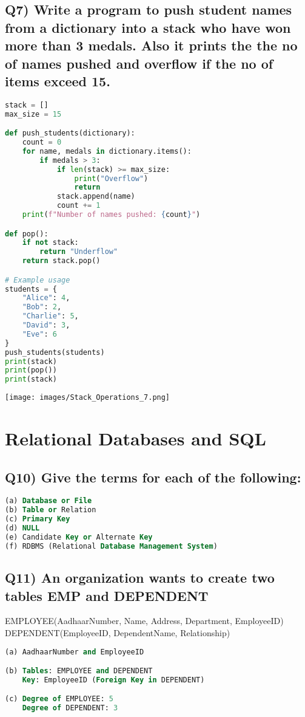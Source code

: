 \documentclass{article}
\begin{document}
\subsection*{Q7) Write a program to push student names from a dictionary into a stack who have won more than 3 medals. Also it prints the the no of names pushed and overflow if the no of items exceed 15.}
\begin{lstlisting}[language=Python]
stack = []
max_size = 15

def push_students(dictionary):
    count = 0
    for name, medals in dictionary.items():
        if medals > 3:
            if len(stack) >= max_size:
                print("Overflow")
                return
            stack.append(name)
            count += 1
    print(f"Number of names pushed: {count}")

def pop():
    if not stack:
        return "Underflow"
    return stack.pop()

# Example usage
students = {
    "Alice": 4,
    "Bob": 2,
    "Charlie": 5,
    "David": 3,
    "Eve": 6
}
push_students(students)
print(stack)
print(pop())
print(stack)
\end{lstlisting}
\texttt{[image: images/Stack\_Operations\_7.png]}

\section{Relational Databases and SQL}

\subsection*{Q10) Give the terms for each of the following:}
\begin{lstlisting}[language=SQL]
(a) Database or File
(b) Table or Relation
(c) Primary Key
(d) NULL
(e) Candidate Key or Alternate Key
(f) RDBMS (Relational Database Management System)
\end{lstlisting}

\subsection*{Q11) An organization wants to create two tables EMP and DEPENDENT}
EMPLOYEE(AadhaarNumber, Name, Address, Department, EmployeeID)\\
DEPENDENT(EmployeeID, DependentName, Relationship)
\begin{lstlisting}[language=SQL]
(a) AadhaarNumber and EmployeeID

(b) Tables: EMPLOYEE and DEPENDENT
    Key: EmployeeID (Foreign Key in DEPENDENT)

(c) Degree of EMPLOYEE: 5
    Degree of DEPENDENT: 3
\end{lstlisting}
\end{document}
